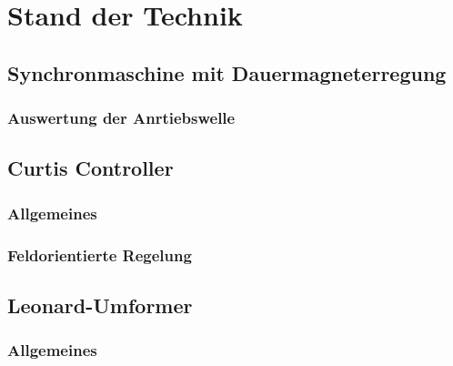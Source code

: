 \chapter{Stand der Technik}


\section{Synchronmaschine mit Dauermagneterregung}
\subsection{Auswertung der Anrtiebswelle}

\section{Curtis Controller}
\subsection{Allgemeines}
\subsection{Feldorientierte Regelung}

\section{Leonard-Umformer}
\subsection{Allgemeines}
\subsection{ }